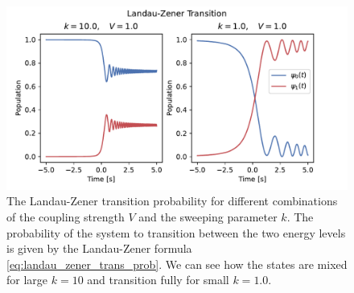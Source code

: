 \documentclass{subfiles}
\begin{document}
\begin{figure}[h!]
    \centering
    \includegraphics[width=1.0\textwidth]{figs/landau_zener.pdf}
    \caption{The Landau-Zener transition probability for different combinations of the coupling strength $V$ and the sweeping parameter $k$. The probability of the system to transition between the two energy levels is given by the Landau-Zener formula \eqref{eq:landau_zener_trans_prob}. We can see how the states are mixed for large $k=10$ and transition fully for small $k=1.0$.}
    \label{fig:landau_zener}
\end{figure} 
\end{document}
